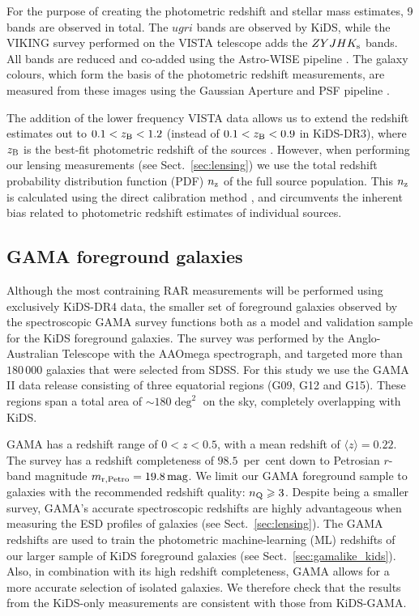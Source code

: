 \documentclass[usenatbib]{mnras}
\newcommand{\magn}{\, {\rm mag} }
\newcommand*{\meanb}[1]{\langle{#1}\rangle}
\newcommand{\un}[1]{_{\rm #1}}
\begin{document}
For the purpose of creating the photometric redshift and stellar mass estimates, 9 bands are observed in total. The $ugri$ bands are observed by KiDS, while the VIKING survey \cite[]{edge2013} performed on the VISTA telescope adds the $ZYJHK\un{s}$ bands. All bands are reduced and co-added using the Astro-WISE pipeline \cite[AW,][]{mcfarland2013}. The galaxy colours, which form the basis of the photometric redshift measurements, are measured from these images using the Gaussian Aperture and PSF pipeline \cite[GAaP,][]{kuijken2008,kuijken2015}.

The addition of the lower frequency VISTA data allows us to extend the redshift estimates out to $0.1<z\un{B}<1.2$ (instead of $0.1<z\un{B}<0.9$ in KiDS-DR3), where $z\un{B}$ is the best-fit photometric redshift of the sources \cite[]{benitez2000,hildebrandt2012}. However, when performing our lensing measurements (see Sect.~\ref{sec:lensing}) we use the total redshift probability distribution function (PDF) $n\un{z}$ of the full source population. This $n\un{z}$ is calculated using the direct calibration method \cite[DIR,][]{hildebrandt2017}, and circumvents the inherent bias related to photometric redshift estimates of individual sources.

\subsection{GAMA foreground galaxies}
\label{sec:gama}

Although the most contraining RAR measurements will be performed using exclusively KiDS-DR4 data, the smaller set of foreground galaxies observed by the spectroscopic GAMA survey \cite[]{driver2011} functions both as a model and validation sample for the KiDS foreground galaxies. The survey was performed by the Anglo-Australian Telescope with the AAOmega spectrograph, and targeted more than $180 \, 000$ galaxies that were selected from SDSS. For this study we use the GAMA II data release \cite[]{liske2015} consisting of three equatorial regions (G09, G12 and G15). These regions span a total area of $\sim180 \deg^2$ on the sky, completely overlapping with KiDS.

GAMA has a redshift range of $0<z<0.5$, with a mean redshift of $\meanb{z}=0.22$. The survey has a redshift completeness of $98.5$~per~cent down to Petrosian $r$-band magnitude $m\un{r,Petro} = 19.8 \magn$. We limit our GAMA foreground sample to galaxies with the recommended redshift quality: $n\un{Q}\geq3$. Despite being a smaller survey, GAMA's accurate spectroscopic redshifts are highly advantageous when measuring the ESD profiles of galaxies (see Sect.~\ref{sec:lensing}). The GAMA redshifts are used to train the photometric machine-learning (ML) redshifts of our larger sample of KiDS foreground galaxies (see Sect.~\ref{sec:gamalike_kids}). Also, in combination with its high redshift completeness, GAMA allows for a more accurate selection of isolated galaxies. We therefore check that the results from the KiDS-only measurements are consistent with those from KiDS-GAMA.
\end{document}
